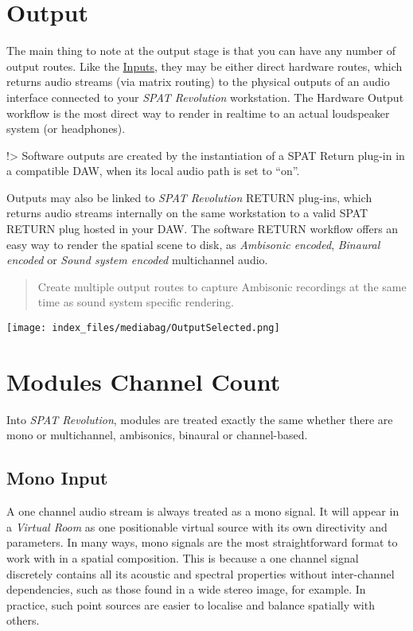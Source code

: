 \documentclass[
  letterpaper,
  DIV=11,
  numbers=noendperiod]{scrreport}
\begin{document}
\hypertarget{output}{%
\chapter{Output}\label{output}}

The main thing to note at the output stage is that you can have any
number of output routes. Like the
\href{6_Spat_Environment_6_4_Inputs_6_4_Inputs.md}{Inputs}, they may be
either direct hardware routes, which returns audio streams (via matrix
routing) to the physical outputs of an audio interface connected to your
\emph{SPAT Revolution} workstation. The Hardware Output workflow is the
most direct way to render in realtime to an actual loudspeaker system
(or headphones).

!\textgreater{} Software outputs are created by the instantiation of a
SPAT Return plug-in in a compatible DAW, when its local audio path is
set to ``on''.

Outputs may also be linked to \emph{SPAT Revolution} RETURN plug-ins,
which returns audio streams internally on the same workstation to a
valid SPAT RETURN plug hosted in your DAW. The software RETURN workflow
offers an easy way to render the spatial scene to disk, as
\emph{Ambisonic encoded}, \emph{Binaural encoded} or \emph{Sound system
encoded} multichannel audio.

\begin{quote}
Create multiple output routes to capture Ambisonic recordings at the
same time as sound system specific rendering.
\end{quote}

\texttt{[image: index\_files/mediabag/OutputSelected.png]}

\hypertarget{modules-channel-count}{%
\chapter{Modules Channel Count}\label{modules-channel-count}}

Into \emph{SPAT Revolution}, modules are treated exactly the same
whether there are mono or multichannel, ambisonics, binaural or
channel-based.

\hypertarget{mono-input}{%
\section{Mono Input}\label{mono-input}}

A one channel audio stream is always treated as a mono signal. It will
appear in a \emph{Virtual Room} as one positionable virtual source with
its own directivity and parameters. In many ways, mono signals are the
most straightforward format to work with in a spatial composition. This
is because a one channel signal discretely contains all its acoustic and
spectral properties without inter-channel dependencies, such as those
found in a wide stereo image, for example. In practice, such point
sources are easier to localise and balance spatially with others.
\end{document}

